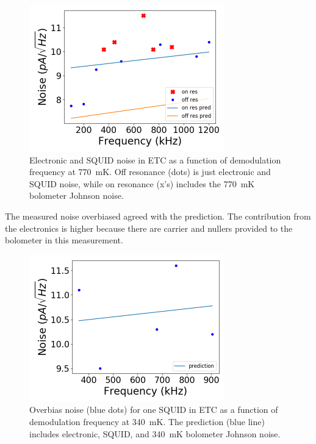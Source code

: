 \begin{figure}[ht!]
\begin{center}
\includegraphics[height=2.5in]{figures/squid_noise_770mK.png}
\caption{Electronic and \ac{SQUID} noise in \ac{ETC} as a function of demodulation frequency at 770~mK. Off resonance (dots) is just electronic and \ac{SQUID} noise, while on resonance (x's) includes the 770~mK bolometer Johnson noise. 
\label{fig:770mK_squid_noise} }
\end{center}
\end{figure}

The measured noise overbiased agreed with the prediction. 
The contribution from the electronics is higher because there are carrier and nullers provided to the bolometer in this measurement. 



\begin{figure}[ht!]
\begin{center}
\includegraphics[height=2.5in]{figures/overbias_noise.png}
\caption{Overbias noise (blue dots) for one \ac{SQUID} in \ac{ETC} as a function of demodulation frequency at 340~mK. The prediction (blue line) includes electronic, \ac{SQUID}, and 340~mK bolometer Johnson noise. 
\label{fig:770mK_squid_noise} }
\end{center}
\end{figure}



